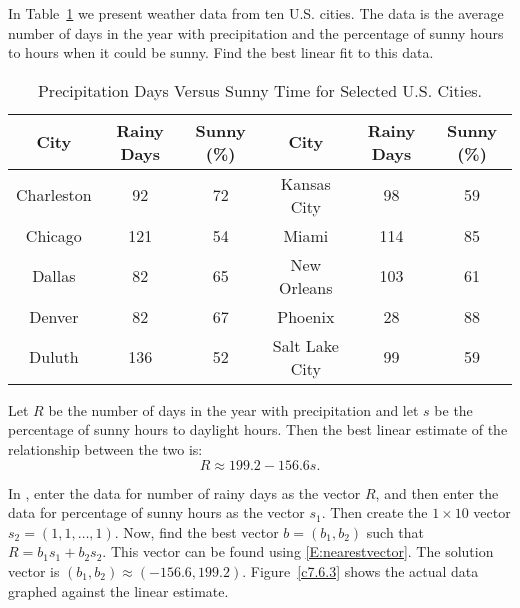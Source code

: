 \documentclass{ximera}
\begin{document}
\begin{exercise} \label{c7.6.3}
In Table~\ref{T:sunny} we present weather data from ten U.S. cities.  The
data is the average number of days in the year with precipitation and the
percentage of sunny hours to hours when it could be sunny.  Find the best
linear fit to this data.
\begin{table}[htb]
\begin{center}
\begin{tabular}{|c||c|c||c||c|c|}
\hline
City & Rainy Days & Sunny (\%) & City & Rainy Days & Sunny (\%)\\
\hline
Charleston 	&   92 & 72 & Kansas City 	&   98 & 59\\
Chicago 	&  121 & 54 & Miami 		&  114 & 85 \\
Dallas 		&   82 & 65 & New Orleans 	&  103 & 61 \\
Denver 		&   82 & 67 & Phoenix 		&   28 & 88 \\
Duluth 		&  136 & 52 & Salt Lake City 	&   99 & 59 \\
\hline
\end{tabular}
\caption{Precipitation Days Versus Sunny Time for Selected U.S. Cities.}
\label{T:sunny}
\end{center}
\end{table}

\begin{solution}

\ans Let $R$ be the number of days in the year with precipitation and
let $s$ be the percentage of sunny hours to daylight hours.  Then the
best linear estimate of the relationship between the two is:
\[ R \approx 199.2 - 156.6s. \]

\soln In \Matlabp, enter the data for number of rainy days as the vector
$R$, and then enter the data for percentage of sunny hours as the vector
$s_1$.  Then create the $1 \times 10$ vector $s_2 = (1,1,\dots,1)$.  Now,
find the best vector $b = (b_1,b_2)$ such that $R = b_1s_1 + b_2s_2$. 
This vector can be found using \eqref{E:nearestvector}.  The solution vector
is $(b_1,b_2) \approx (-156.6,199.2)$.  Figure~\ref{c7.6.3} shows the
actual data graphed against the linear estimate.

\begin{figure}[htb]
		\centerline{%
		}
\end{figure}



\end{solution}
\end{exercise}
\end{document}

